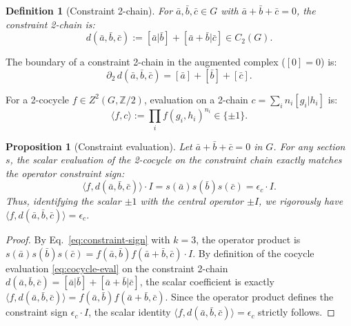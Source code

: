 \documentclass[11pt]{article}
\newtheorem{proposition}[theorem]{Proposition}
\newtheorem{definition}[theorem]{Definition}
\begin{document}
\begin{definition}[Constraint 2-chain]
\label{def:constraint-chain}
For $\bar{a}, \bar{b}, \bar{c} \in G$ with $\bar{a} + \bar{b} + \bar{c} = 0$,
the \emph{constraint 2-chain} is:
\begin{equation}
\label{eq:constraint-2chain}
  d(\bar{a}, \bar{b}, \bar{c}) := [\bar{a}|\bar{b}] + [\bar{a}+\bar{b}|\bar{c}]
  \in C_2(G).
\end{equation}
\end{definition}

The boundary of a constraint 2-chain in the augmented complex ($[0] = 0$) is:
\begin{equation}
\label{eq:constraint-boundary}
  \partial_2 \, d(\bar{a}, \bar{b}, \bar{c}) = [\bar{a}] + [\bar{b}] + [\bar{c}].
\end{equation}

For a 2-cocycle $f \in Z^2(G, \mathbb{Z}/2)$, evaluation on a
2-chain $c = \sum_i n_i [g_i|h_i]$ is:
\begin{equation}
\label{eq:cocycle-eval}
  \langle f, c \rangle := \prod_i f(g_i, h_i)^{n_i} \in \{\pm 1\}.
\end{equation}

\begin{proposition}[Constraint evaluation]
\label{prop:constraint-eval}
Let $\bar{a} + \bar{b} + \bar{c} = 0$ in $G$. For any section $s$, the scalar evaluation of the 2-cocycle on the constraint chain exactly matches the operator constraint sign:
\[
  \langle f, d(\bar{a}, \bar{b}, \bar{c}) \rangle \cdot I
  = s(\bar{a}) s(\bar{b}) s(\bar{c})
  = \epsilon_c \cdot I.
\]
Thus, identifying the scalar $\pm 1$ with the central operator $\pm I$, we rigorously have $\langle f, d(\bar{a}, \bar{b}, \bar{c}) \rangle = \epsilon_c$.
\end{proposition}

\begin{proof}
By Eq.~\eqref{eq:constraint-sign} with $k=3$, the operator product is $s(\bar{a})s(\bar{b})s(\bar{c}) = f(\bar{a}, \bar{b}) f(\bar{a}+\bar{b}, \bar{c}) \cdot I$.
By definition of the cocycle evaluation \eqref{eq:cocycle-eval} on the constraint 2-chain $d(\bar{a},\bar{b},\bar{c}) = [\bar{a}|\bar{b}] + [\bar{a}+\bar{b}|\bar{c}]$, the scalar coefficient is exactly $\langle f, d(\bar{a}, \bar{b}, \bar{c}) \rangle = f(\bar{a}, \bar{b}) f(\bar{a}+\bar{b}, \bar{c})$.
Since the operator product defines the constraint sign $\epsilon_c \cdot I$, the scalar identity $\langle f, d(\bar{a}, \bar{b}, \bar{c}) \rangle = \epsilon_c$ strictly follows.
\end{proof}
\end{document}
